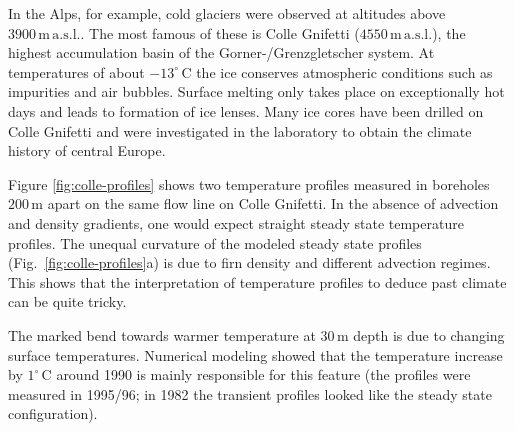 \documentclass[parskip=half]{scrartcl}
\newcommand{\unit}[1]{\ensuremath{\,\mathrm{#1}}}
\newcommand{\cels}[1]{\ensuremath{#1^{\circ}\,\mathrm{C}}}
\begin{document}
In the Alps, for example, cold glaciers were observed at altitudes
above $3900\unit{m}\unit{a.s.l.}$.  The most famous of these is Colle
Gnifetti ($4550 \unit{m}\unit{a.s.l.}$), the highest accumulation
basin of the Gorner-/Grenzgletscher system.  At temperatures of about
\cels{-13} the ice conserves atmospheric conditions such as impurities
and air bubbles.  Surface melting only takes place on exceptionally
hot days and leads to formation of ice lenses.  Many ice cores have
been drilled on Colle Gnifetti and were investigated in the laboratory
to obtain the climate history of central Europe.

Figure \ref{fig:colle-profiles} shows two temperature profiles
measured in boreholes $200\unit{m}$ apart on the same flow line on
Colle Gnifetti.  In the absence of advection and density gradients,
one would expect straight steady state temperature profiles.  The
unequal curvature of the modeled steady state profiles
(Fig.~\ref{fig:colle-profiles}a) is due to firn density and different
advection regimes.  This shows that the interpretation of temperature
profiles to deduce past climate can be quite tricky.

The marked bend towards warmer temperature at $30\unit{m}$ depth is
due to changing surface temperatures.  Numerical modeling showed that
the temperature increase by \cels{1} around 1990 is mainly responsible
for this feature (the profiles were measured in 1995/96; in 1982 the
transient profiles looked like the steady state configuration).
\end{document}
